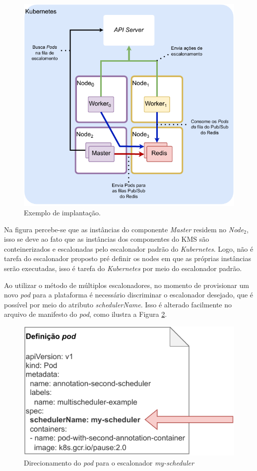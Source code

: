 \documentclass[
	12pt,				%
	openright,			%
	oneside,			%
	a4paper,			%
	brazil				%
	]{abntex2}
\begin{document}
\begin{figure}[h!]
	\caption{\label{fig:proposta_kubernetes}Exemplo de implantação.}
	\centering
	\includegraphics[width=.7\linewidth]{assets/arquitetura-worker.pdf}
\end{figure}

Na figura percebe-se que as instâncias do componente \textit{Master} residem no \textit{Node$_2$}, isso se deve ao fato que as instâncias dos componentes do \ac{KMS} são conteinerizados e escalonadas pelo escalonador padrão do \textit{Kubernetes}. Logo, não é tarefa do escalonador proposto pré definir os nodes em que as próprias instâncias serão executadas, isso é tarefa do \textit{Kubernetes} por meio do escalonador padrão.

Ao utilizar o método de múltiplos escalonadores, no momento de provisionar um novo \textit{pod} para a plataforma é necessário discriminar o escalonador desejado, que é possível por meio do atributo \textit{schedulerName}. Isso é alterado facilmente no arquivo de manifesto do \textit{pod}, como ilustra a Figura \ref{fig:pod_custom_scheduler}.

\begin{figure}[h!]
	\caption{\label{fig:pod_custom_scheduler}Direcionamento do \textit{pod} para o escalonador \textit{my-scheduler}}
	\centering
	\includegraphics[width=0.6\linewidth]{assets/pod-custom-scheduler.pdf}
\end{figure}
\end{document}
